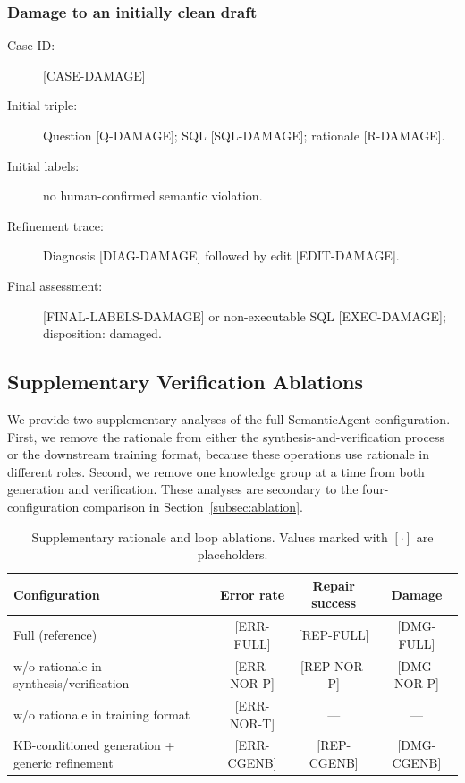 \documentclass[letterpaper,journal]{IEEEtran}
\begin{document}
\subsubsection{Damage to an initially clean draft}
\label{app:refinement-cases:damage}

\begin{description}
\item[Case ID:] [CASE-DAMAGE]
\item[Initial triple:] Question [Q-DAMAGE]; SQL [SQL-DAMAGE]; rationale [R-DAMAGE].
\item[Initial labels:] no human-confirmed semantic violation.
\item[Refinement trace:] Diagnosis [DIAG-DAMAGE] followed by edit [EDIT-DAMAGE].
\item[Final assessment:] [FINAL-LABELS-DAMAGE] or non-executable SQL [EXEC-DAMAGE]; disposition: damaged.
\end{description}

\subsection{Supplementary Verification Ablations}
\label{app:verification-ablation-details}

We provide two supplementary analyses of the full SemanticAgent configuration. First, we remove the rationale from either the synthesis-and-verification process or the downstream training format, because these operations use rationale in different roles. Second, we remove one knowledge group at a time from both generation and verification. These analyses are secondary to the four-configuration comparison in Section~\ref{subsec:ablation}.

\begin{table}[!t]
\centering
\caption{Supplementary rationale and loop ablations. Values marked with $[\cdot]$ are placeholders.}
\label{tab:ablation-rationale-loop}
\small
\setlength{\tabcolsep}{4pt}
\renewcommand{\arraystretch}{1.15}
\begin{tabular}{lccc}
\toprule
\textbf{Configuration} & \textbf{Error rate} & \textbf{Repair success} & \textbf{Damage} \\
\midrule
Full (reference) & [ERR-FULL] & [REP-FULL] & [DMG-FULL] \\
w/o rationale in synthesis/verification & [ERR-NOR-P] & [REP-NOR-P] & [DMG-NOR-P] \\
w/o rationale in training format & [ERR-NOR-T] & --- & --- \\
KB-conditioned generation + generic refinement & [ERR-CGENB] & [REP-CGENB] & [DMG-CGENB] \\
\bottomrule
\end{tabular}
\end{table}
\end{document}
